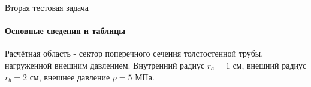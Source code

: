 \documentclass{beamer}
\begin{document}
\begin{frame}{Вторая тестовая задача}
\framesubtitle{Основные сведения и таблицы}
\footnotesize
\begin{multicols}{2}
Расчётная область - сектор поперечного сечения толстостенной трубы, нагруженной внешним давлением. Внутренний радиус $r_a = 1$ см, внешний радиус $r_b = 2$ см, внешнее давление $p = 5$ МПа.
\begin{figure}[h]
\end{figure}

\columnbreak


\end{multicols}
\end{frame}
\end{document}
